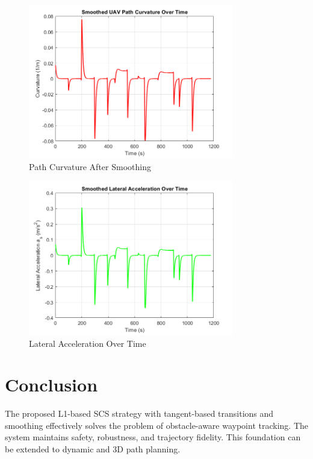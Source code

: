 \documentclass[12pt]{article}
\begin{document}
\begin{figure}[H]
  \centering
  \includegraphics[width=0.8\textwidth]{images/Curvature_after_smooth.png}
  \caption{Path Curvature After Smoothing}
\end{figure}

\begin{figure}[H]
  \centering
  \includegraphics[width=0.8\textwidth]{images/Lateral_acc.png}
  \caption{Lateral Acceleration Over Time}
\end{figure}

\section{Conclusion}
The proposed L1-based SCS strategy with tangent-based transitions and smoothing effectively solves the problem of obstacle-aware waypoint tracking. The system maintains safety, robustness, and trajectory fidelity. This foundation can be extended to dynamic and 3D path planning.
\end{document}
